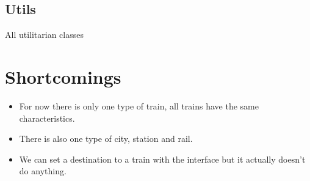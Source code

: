 \documentclass{article}
\begin{document}
\subsection{Utils}
All utilitarian classes

\section{Shortcomings}
\begin{itemize}
	\item For now there is only one type of train, all trains have the same characteristics.
	\item There is also one type of city, station and rail.
	\item We can set a destination to a train with the interface but it actually doesn't do anything.
\end{itemize}
\end{document}
